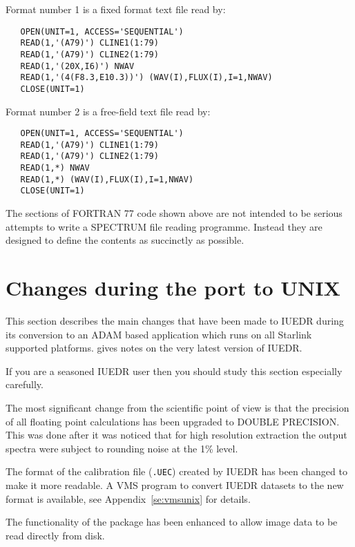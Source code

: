 Format number 1 is a fixed format text file read by:

\begin{verbatim}
   OPEN(UNIT=1, ACCESS='SEQUENTIAL')
   READ(1,'(A79)') CLINE1(1:79)
   READ(1,'(A79)') CLINE2(1:79)
   READ(1,'(20X,I6)') NWAV
   READ(1,'(4(F8.3,E10.3))') (WAV(I),FLUX(I),I=1,NWAV)
   CLOSE(UNIT=1)
\end{verbatim}

Format number 2 is a free-field text file read by:

\begin{verbatim}
   OPEN(UNIT=1, ACCESS='SEQUENTIAL')
   READ(1,'(A79)') CLINE1(1:79)
   READ(1,'(A79)') CLINE2(1:79)
   READ(1,*) NWAV
   READ(1,*) (WAV(I),FLUX(I),I=1,NWAV)
   CLOSE(UNIT=1)
\end{verbatim}

The sections of FORTRAN 77 code shown above are not intended to be serious
attempts to write a SPECTRUM file reading programme.  Instead they are designed
to define the contents as succinctly as possible.

\newpage
\section{Changes during the port to UNIX}

This section describes the main changes that have been made to IUEDR
during its conversion to an ADAM based application which runs on
all Starlink supported platforms.   gives notes on the
very latest version of IUEDR.

If you are a seasoned IUEDR user then you should study this section
especially carefully.

The most significant change from the scientific point of view is that
the precision of all floating point calculations has been upgraded to
DOUBLE PRECISION. This was done after it was noticed that for high
resolution extraction the output spectra were subject to rounding
noise at the 1\% level.

The format of the calibration file ({\tt .UEC}) created by IUEDR has
been  changed to make it more readable. A VMS program to convert
IUEDR datasets to the new format is available, see Appendix~\ref{se:vmsunix}
for details.

The functionality of the package has been enhanced to allow image data
to be read directly from disk.


